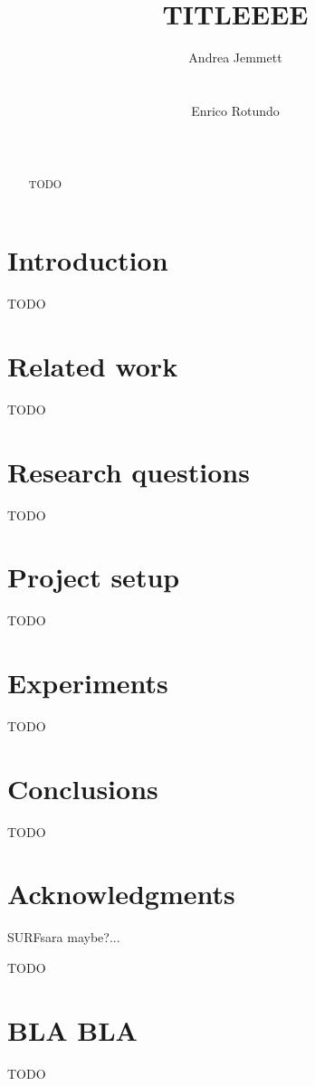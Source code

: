 \documentclass{vldb}
\begin{document}
\title{TITLEEEE}


\author{
\alignauthor
Andrea Jemmett\\
       \\
       \\
\alignauthor
Enrico Rotundo\\
       \\
       \\
}


\maketitle

\begin{abstract}
TODO
\end{abstract}


\section{Introduction}
TODO

\section{Related work}
TODO

\section{Research questions}
TODO

\section{Project setup}
TODO

\section{Experiments}
TODO

\section{Conclusions}
TODO


\section{Acknowledgments}
SURFsara maybe?...

\balance

 

\begin{appendix}
TODO

\section{BLA BLA}
TODO

\end{appendix}
\end{document}
